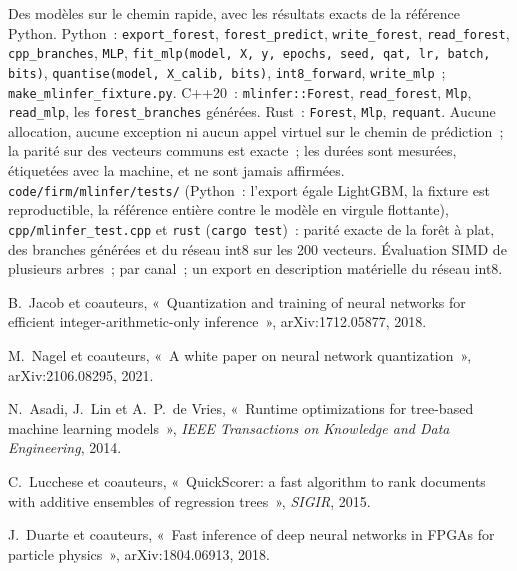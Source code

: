 \begin{build}
 Des modèles sur le chemin rapide, avec les résultats exacts de la référence Python.
 Python~: \texttt{export\_forest}, \texttt{forest\_predict}, \texttt{write\_forest}, \texttt{read\_forest},
\texttt{cpp\_branches}, \texttt{MLP}, \texttt{fit\_mlp(model, X, y, epochs, seed, qat, lr, batch, bits)},
\texttt{quantise(model, X\_calib, bits)}, \texttt{int8\_forward}, \texttt{write\_mlp}~; \texttt{make\_mlinfer\_fixture.py}. C++20~: \texttt{mlinfer::Forest},
\texttt{read\_forest}, \texttt{Mlp}, \texttt{read\_mlp}, les \texttt{forest\_branches} générées. Rust~: \texttt{Forest},
\texttt{Mlp}, \texttt{requant}.
 Aucune allocation, aucune exception ni aucun appel virtuel sur le chemin de prédiction~; la parité sur des vecteurs communs est exacte~; les durées
sont mesurées, étiquetées avec la machine, et ne sont jamais affirmées.
 \texttt{code/firm/mlinfer/tests/} (Python~: l'export égale LightGBM, la fixture est reproductible, la référence entière
contre le modèle en virgule flottante), \texttt{cpp/mlinfer\_test.cpp} et \texttt{rust} (\texttt{cargo test})~: parité exacte de la
forêt à plat, des branches générées et du réseau int8 sur les 200 vecteurs.
 Évaluation SIMD de plusieurs arbres~;  par canal~; un export en description matérielle du réseau int8.
\end{build}

\begin{omsources}
\item B.~Jacob et coauteurs, «~Quantization and training of neural networks for efficient integer-arithmetic-only
inference~», arXiv:1712.05877, 2018.
\item M.~Nagel et coauteurs, «~A white paper on neural network quantization~», arXiv:2106.08295, 2021.
\item N.~Asadi, J.~Lin et A.~P.~de Vries, «~Runtime optimizations for tree-based machine learning models~», \emph{IEEE
Transactions on Knowledge and Data Engineering}, 2014.
\item C.~Lucchese et coauteurs, «~QuickScorer: a fast algorithm to rank documents with additive ensembles of regression
trees~», \emph{SIGIR}, 2015.
\item J.~Duarte et coauteurs, «~Fast inference of deep neural networks in FPGAs for particle physics~», arXiv:1804.06913,
2018.
\end{omsources}

